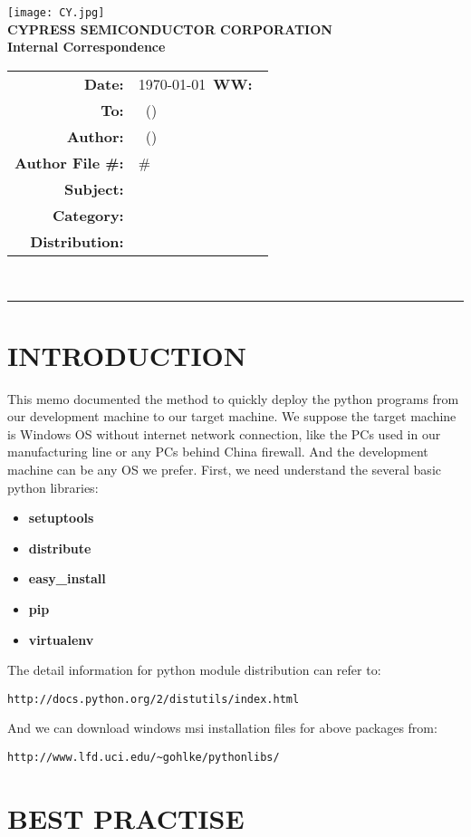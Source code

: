 \documentclass{article}
\renewcommand{\maketitle}
{
    \begin{center}
    \texttt{[image: CY.jpg]}\\
    \vspace{5 mm}
    \large
    {
    \textbf{CYPRESS SEMICONDUCTOR CORPORATION}\\
    \textbf{Internal Correspondence}\\
    }
    \vspace{1 mm}
    \hspace{0.5 in}
    \begin{tabular}{rl}
    \bf Date: & \today\ \hspace{2 in}\textbf{WW:\ }\WorkWeek\\
    \bf To: & \BossName\ (\BossInitials)\\
    \bf Author: & \Author\ (\AuthorInitials)\\
    \bf Author File \#: & \AuthorInitials\#\MemoNumber\\
    \bf Subject: & \Subject\\
    \bf Category: & \Category\\
    \bf Distribution: & \Distribution\\
    \end{tabular}
    \vspace{3 mm}\\
    \hrule
    \end{center}
    
    \thispagestyle{firstpage}
    \pagestyle{normalpage}
}
\begin{document}
\maketitle

\section{INTRODUCTION}
This memo documented the method to quickly deploy the python programs from our development machine to our target machine.
We suppose the target machine is Windows OS without internet network connection, 
like the PCs used in our manufacturing line or any PCs behind China firewall.
And the development machine can be any OS we prefer.
First, we need understand the several basic python libraries:
\begin{itemize}
    \item
    \textbf{setuptools} 
    \item
    \textbf{distribute} 
    \item
    \textbf{easy\_install} 
    \item
    \textbf{pip} 
    \item
    \textbf{virtualenv} 
\end{itemize}
The detail information for python module distribution can refer to:
\begin{lstlisting}
http://docs.python.org/2/distutils/index.html 
\end{lstlisting}
And we can download windows msi installation files for above packages from:
\begin{lstlisting}
http://www.lfd.uci.edu/~gohlke/pythonlibs/
\end{lstlisting}

\newpage
\section{BEST PRACTISE}
\end{document}
